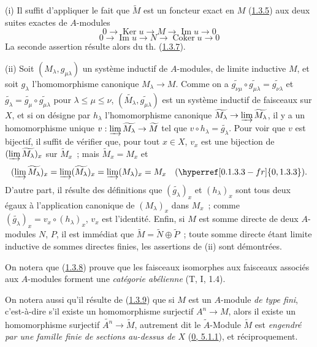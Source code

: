 (i) Il suffit d'appliquer le fait que $\widetilde{M}$ est un foncteur exact en
$M$ (\hyperref[I.1.3.5-fr]{1.3.5}) aux deux suites exactes de $A$-modules
\[
  0\to\operatorname{Ker}u\to M\to\operatorname{Im}u\to0
\]
\[
  0\to\operatorname{Im}u\to N\to\operatorname{Coker}u\to0
\]
La seconde assertion résulte alors du th.
(\hyperref[I.1.3.7-fr]{1.3.7}).

(ii) Soit $(M_\lambda,g_{\mu\lambda})$ un système inductif de $A$-modules, de
limite inductive $M$, et soit $g_\lambda$ l'homomorphisme canonique
$M_\lambda\to M$. Comme on a
$\widetilde{g_{\nu\mu}}\circ\widetilde{g_{\mu\lambda}}
=\widetilde{g_{\nu\lambda}}$ et
$\widetilde{g_\lambda}=\widetilde{g_\mu}\circ
\widetilde{g_{\mu\lambda}}$ pour $\lambda\leq\mu\leq\nu$,
$(\widetilde{M_\lambda},\widetilde{g_{\mu\lambda}})$ est un système
inductif de faisceaux sur $X$, et si on désigne par $h_\lambda$
l'homomorphisme canonique
$\widetilde{M_\lambda}\to\varinjlim\widetilde{M_\lambda}$, il y a un
homomorphisme unique
$v:\varinjlim\widetilde{M_\lambda}\to\widetilde{M}$ tel que
$v\circ h_\lambda=\widetilde{g_\lambda}$. Pour voir que $v$ est bijectif, il
suffit de vérifier que, pour tout $x\in X$, $v_x$ est une bijection de
$(\varinjlim\widetilde{M_\lambda})_x$ sur $\widetilde{M}_x$~; mais
$\widetilde{M}_x=M_x$ et
\[
  (\varinjlim\widetilde{M_\lambda})_x
  =\varinjlim(\widetilde{M_\lambda})_x
  =\varinjlim(M_\lambda)_x=M_x
  \quad(\hyperref[0.1.3.3-fr]{0, 1.3.3}).
\]
D'autre part, il résulte des définitions que $(\widetilde{g_\lambda})_x$ et
$(h_\lambda)_x$ sont tous deux égaux à l'application canonique de
$(M_\lambda)_x$ dans $M_x$~; comme
$(\widetilde{g_\lambda})_x=v_x\circ(h_\lambda)_x$, $v_x$ est l'identité.
Enfin, si $M$ est somme directe de deux $A$-modules $N$, $P$, il est immédiat
que $\widetilde{M}=\widetilde{N}\oplus\widetilde{P}$~; toute somme directe
étant limite inductive de sommes directes finies, les assertions de (ii) sont
démontrées.

On notera que (\hyperref[I.1.3.8-fr]{1.3.8}) prouve que les faisceaux
isomorphes aux faisceaux associés aux $A$-modules forment une
\emph{catégorie abélienne} (T, I, 1.4).

On notera aussi qu'il résulte de (\hyperref[I.1.3.9-fr]{1.3.9}) que si $M$ est
un $A$-module \emph{de type fini}, c'est-à-dire s'il existe un homomorphisme
surjectif $A^n\to M$, alors il existe un homomorphisme surjectif
$\widetilde{A^n}\to\widetilde{M}$, autrement dit le $\widetilde{A}$-Module
$\widetilde{M}$ est \emph{engendré par une famille finie de sections au-dessus
de $X$} (\hyperref[0.5.1.1-fr]{0, 5.1.1}), et réciproquement.

